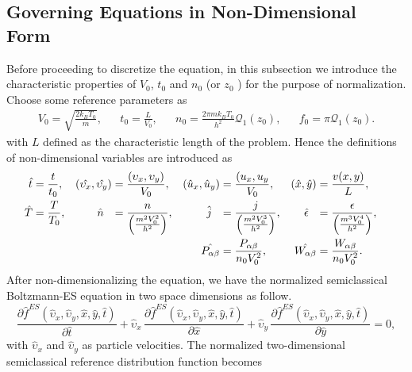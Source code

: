 \documentclass{rsproca}%
\begin{document}
\subsection{Governing Equations in Non-Dimensional Form}
\label{subsec:3_1}
Before proceeding to discretize the equation, in this subsection we introduce the characteristic properties of $V_0$, $t_0$ and $n_0$ (or $z_0$ ) for the purpose of normalization.  Choose some reference parameters as
\begin{align}
&V_0 = \sqrt{\frac{2k_B T_0}{m}},& &t_0 = \frac{L}{V_0},& &n_{0} = \frac{2 \pi m k_B T_0}{h^2} \mathcal{Q}_1 (z_0),& &f_0=\pi \mathcal{Q}_1(z_0).&
\end{align}
with $L$ defined as the characteristic length of the problem. Hence the definitions of non-dimensional variables are introduced as
\begin{equation}
\begin{aligned}
\hat{t} &=\frac{t}{t_0},& (\hat{\upsilon_x}, \hat{\upsilon_y})&=\frac{(\upsilon_x,\upsilon_y)}{V_0},&
(\hat{u}_x,\hat{u}_y)&=\frac{(u_x,u_y}{V_0},& (\hat{x},\hat{y})&=\frac{v(x, y)}{L},& \\
\hat{T}&=\frac{T}{T_0},& \hat{n}\hspace{0.1in}&=\frac{n}{\left(\frac{m^2V_0^2}{h^2}\right)},&
\hat{j}\hspace{0.1in}&=\frac{j}{\left(\frac{m^2V_{0}^3}{h^2}\right) },& \hat{\epsilon}\hspace{0.1in}&=\frac{\epsilon}{\left(\frac{m^3 V_{0}^4}{h^2}\right)},& \\
& & & &\hat{P_{\alpha \beta}} &= \frac{P_{\alpha \beta}}{n_{0} V_{0}^2 },& \hat{W_{\alpha \beta}} &= \frac{W_{\alpha \beta}}{n_{0} V_0^2}.&
\end{aligned}
\end{equation}
After non-dimensionalizing the equation, we have the normalized semiclassical Boltzmann-ES equation in two space dimensions as follow.
\begin{equation}
\frac{\partial\hat{f}^{ES}(\hat{\upsilon}_x,\hat{\upsilon}_y,\hat{x},\hat{y},\hat{t})}{\partial\hat{t}} + \hat{\upsilon}_x\,\frac{\partial\hat{f}^{ES}(\hat{\upsilon}_x,\hat{\upsilon}_y,\hat{x},\hat{y},\hat{t})}{\partial\hat{x}} + \hat{\upsilon}_y\,\frac{\partial\hat{f}^{ES}(\hat{\upsilon}_x,\hat{\upsilon}_y,\hat{x},\hat{y},\hat{t})}{\partial\hat{y}} = 0,
\label{eq:normalized_B_ES_BGK_2D}
\end{equation}
with $\hat{\upsilon}_x$ and $\hat{\upsilon}_y$ as particle velocities. The normalized two-dimensional semiclassical reference distribution function becomes
\end{document}
